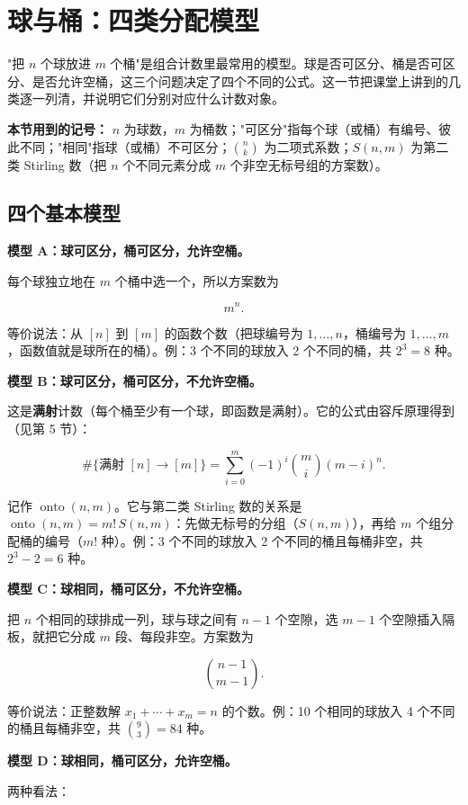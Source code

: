 \section{球与桶：四类分配模型}


"把 $n$ 个球放进 $m$ 个桶"是组合计数里最常用的模型。球是否可区分、桶是否可区分、是否允许空桶，这三个问题决定了四个不同的公式。这一节把课堂上讲到的几类逐一列清，并说明它们分别对应什么计数对象。

\textbf{本节用到的记号：} $n$ 为球数，$m$ 为桶数；"可区分"指每个球（或桶）有编号、彼此不同；"相同"指球（或桶）不可区分；$\binom nk$ 为二项式系数；$S(n,m)$ 为第二类 Stirling 数（把 $n$ 个不同元素分成 $m$ 个非空无标号组的方案数）。

\subsection{四个基本模型}


\textbf{模型 A：球可区分，桶可区分，允许空桶。}

每个球独立地在 $m$ 个桶中选一个，所以方案数为

\[
m^n.
\]

等价说法：从 $[n]$ 到 $[m]$ 的函数个数（把球编号为 $1,\dots,n$，桶编号为 $1,\dots,m$，函数值就是球所在的桶）。例：3 个不同的球放入 2 个不同的桶，共 $2^3=8$ 种。

\textbf{模型 B：球可区分，桶可区分，不允许空桶。}

这是\textbf{满射}计数（每个桶至少有一个球，即函数是满射）。它的公式由容斥原理得到（见第 5 节）：

\[
\#\{\text{满射 }[n]\to[m]\}=\sum_{i=0}^{m}(-1)^i\binom mi(m-i)^n .
\]

记作 $\operatorname{onto}(n,m)$。它与第二类 Stirling 数的关系是 $\operatorname{onto}(n,m)=m!\,S(n,m)$：先做无标号的分组（$S(n,m)$），再给 $m$ 个组分配桶的编号（$m!$ 种）。例：3 个不同的球放入 2 个不同的桶且每桶非空，共 $2^3-2=6$ 种。

\textbf{模型 C：球相同，桶可区分，不允许空桶。}

把 $n$ 个相同的球排成一列，球与球之间有 $n-1$ 个空隙，选 $m-1$ 个空隙插入隔板，就把它分成 $m$ 段、每段非空。方案数为

\[
\binom{n-1}{m-1}.
\]

等价说法：正整数解 $x_1+\cdots+x_m=n$ 的个数。例：10 个相同的球放入 4 个不同的桶且每桶非空，共 $\binom93=84$ 种。

\textbf{模型 D：球相同，桶可区分，允许空桶。}

两种看法：

